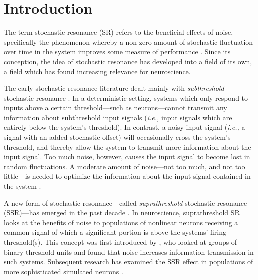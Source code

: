 \documentclass[12pt]{article}
\begin{document}

\section{Introduction}
\label{scn:introduction}

The term stochastic resonance (SR) refers to the beneficial effects of noise, specifically the phenomenon whereby a non-zero amount of stochastic fluctuation over time in the system improves some measure of performance \citep{McDonnell2009}. Since its conception, the idea of stochastic resonance has developed into a field of its own, a field which has found increasing relevance for neuroscience.

The early stochastic resonance literature dealt mainly with \emph{subthreshold} stochastic resonance \citep{Gammaitoni1998}. In a deterministic setting, systems which only respond to inputs above a certain threshold---such as neurons---cannot transmit any information about subthreshold input signals (\emph{i.e.,} input signals which are entirely below the system's threshold). In contrast, a noisy input signal (\emph{i.e.,} a signal with an added stochastic offset) will occasionally cross the system's threshold, and thereby allow the system to transmit more information about the input signal. Too much noise, however, causes the input signal to become lost in random fluctuations. A moderate amount of noise---not too much, and not too little---is needed to optimize the information about the input signal contained in the system \citep{Wiesenfeld1994,Longtin1998}.

A new form of stochastic resonance---called \emph{suprathreshold} stochastic resonance (SSR)---has emerged in the past decade \citep{McDonnell2009,McDonnell2011}. In neuroscience, suprathreshold SR looks at the benefits of noise to populations of nonlinear neurons receiving a common signal of which a significant portion is above the systems' firing threshold(s). This concept was first introduced by \cite{Stocks2000}, who looked at groups of binary threshold units and found that noise increases information transmission in such systems. Subsequent research has examined the SSR effect in populations of more sophisticated simulated neurons \citep{Stocks2001}.
\end{document}
